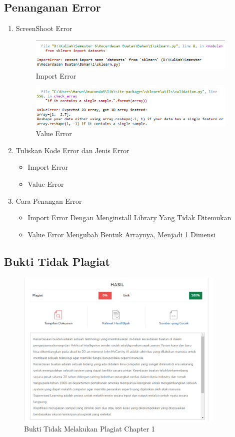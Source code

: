 \subsection{Penanganan Error}
\begin{enumerate}
	\item ScreenShoot Error
	\begin{figure}[H]
		\includegraphics[width=10cm]{figures/1184053/chapter1/3.png}
		\centering
		\caption{Import Error}
	\end{figure}
	\begin{figure}[H]
		\includegraphics[width=10cm]{figures/1184053/chapter1/4.png}
		\centering
		\caption{Value Error}
	\end{figure}
	\item Tuliskan Kode Error dan Jenis Error
	\begin{itemize}
		\item Import Error
		\item Value Error
	\end{itemize}
	\item Cara Penangan Error
	\begin{itemize}
		\item Import Error
		\hfill\break
		Dengan Menginstall Library Yang Tidak Ditemukan
		\item Value Error
		\hfill\break
		Mengubah Bentuk Arraynya, Menjadi 1 Dimensi
	\end{itemize}
\end{enumerate}
	\subsection{Bukti Tidak Plagiat}
\begin{figure}[h]
	\includegraphics[width=10cm]{figures/1184053/chapter1/plagiat.png}
	\centering
	\caption{Bukti Tidak Melakukan Plagiat Chapter 1}
\end{figure}